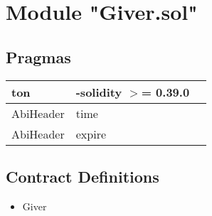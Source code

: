 
\section{Module "Giver.sol"}


\subsection{Pragmas}


\noindent\begin{tabular}{|l|l|p{5cm}|}\hline
ton & -solidity $>$= 0.39.0 &\\\hline
AbiHeader &  time &\\\hline
AbiHeader &  expire &\\\hline
\end{tabular}


\subsection{Contract Definitions}

\begin{itemize}
\item Giver
\end{itemize}
